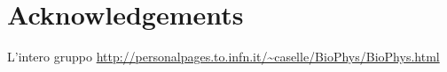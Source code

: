 \chapter*{Acknowledgements}

L'intero gruppo \url{http://personalpages.to.infn.it/~caselle/BioPhys/BioPhys.html}